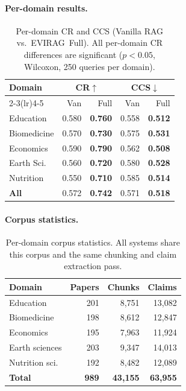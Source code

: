 \documentclass[11pt]{article}
\newcommand{\system}{\textsc{EVIRAG}\xspace}
\begin{document}
\paragraph{Per-domain results.}
\begin{table}[h]
\centering\small
\setlength{\tabcolsep}{4pt}
\begin{tabular}{@{}lrrrr@{}}
\toprule
\textbf{Domain} & \multicolumn{2}{c}{\textbf{CR}$\uparrow$} & \multicolumn{2}{c}{\textbf{CCS}$\downarrow$} \\
\cmidrule(lr){2-3}\cmidrule(lr){4-5}
 & Van & Full & Van & Full \\
\midrule
Education    & 0.580 & \textbf{0.760} & 0.558 & \textbf{0.512} \\
Biomedicine  & 0.570 & \textbf{0.730} & 0.575 & \textbf{0.531} \\
Economics    & 0.590 & \textbf{0.790} & 0.562 & \textbf{0.508} \\
Earth Sci.   & 0.560 & \textbf{0.720} & 0.580 & \textbf{0.528} \\
Nutrition    & 0.550 & \textbf{0.710} & 0.585 & \textbf{0.514} \\
\midrule
\textbf{All} & 0.572 & \textbf{0.742} & 0.571 & \textbf{0.518} \\
\bottomrule
\end{tabular}
\caption{Per-domain CR and CCS (Vanilla RAG vs.\ \system\ Full).
All per-domain CR differences are significant ($p{<}0.05$, Wilcoxon,
250 queries per domain).}
\label{tab:perdomain}
\end{table}

\paragraph{Corpus statistics.}
\begin{table}[h]
\centering\small
\setlength{\tabcolsep}{4pt}
\begin{tabular}{@{}lrrr@{}}
\toprule
\textbf{Domain} & \textbf{Papers} & \textbf{Chunks} & \textbf{Claims} \\
\midrule
Education        & 201 & 8{,}751  & 13{,}082 \\
Biomedicine      & 198 & 8{,}612  & 12{,}847 \\
Economics        & 195 & 7{,}963  & 11{,}924 \\
Earth sciences   & 203 & 9{,}347  & 14{,}013 \\
Nutrition sci.   & 192 & 8{,}482  & 12{,}089 \\
\midrule
\textbf{Total}   & \textbf{989} & \textbf{43{,}155} & \textbf{63{,}955} \\
\bottomrule
\end{tabular}
\caption{Per-domain corpus statistics.  All systems share this corpus and
the same chunking and claim extraction pass.}
\label{tab:corpus}
\end{table}
\end{document}
